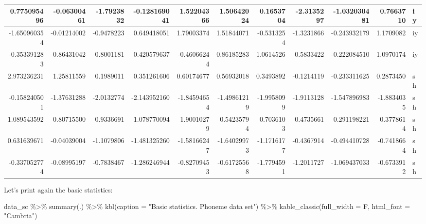 \documentclass[
]{article}
\newenvironment{Shaded}{\begin{snugshade}}{\end{snugshade}}
\newcommand{\AttributeTok}[1]{\textcolor[rgb]{0.77,0.63,0.00}{#1}}
\newcommand{\FunctionTok}[1]{\textcolor[rgb]{0.00,0.00,0.00}{#1}}
\newcommand{\NormalTok}[1]{#1}
\newcommand{\SpecialCharTok}[1]{\textcolor[rgb]{0.00,0.00,0.00}{#1}}
\newcommand{\StringTok}[1]{\textcolor[rgb]{0.31,0.60,0.02}{#1}}
\begin{document}
\begin{table}
\begin{tabular}[t]{r|r|r|r|r|r|r|r|r|r|l}
0.775095496 & -0.06300461 & -1.7923832 & -0.128169041 & 1.52204366 & 1.50642024 & 0.1653704 & -2.3135297 & -1.032030481 & 0.7663710 & iy\\
\hline
-1.650960354 & -0.01214002 & -0.9478223 & 0.649418051 & 1.79003374 & 1.51844071 & -0.5313254 & -1.3231866 & -0.243932179 & 1.1709082 & iy\\
\hline
-0.353391283 & 0.86431042 & 0.8001181 & 0.420579637 & -0.46066244 & 0.86185283 & 1.0614526 & 0.5833422 & -0.222084510 & 1.0970174 & iy\\
\hline
2.973236231 & 1.25811559 & 0.1989011 & 0.351261606 & 0.60174677 & 0.56932018 & 0.3493892 & -0.1214119 & -0.233311625 & 0.2873450 & sh\\
\hline
-0.158240501 & -1.37631288 & -2.0132774 & -2.143952160 & -1.84594654 & -1.49861219 & -1.9958099 & -1.9113128 & -1.547896983 & -1.8834035 & sh\\
\hline
1.089543592 & 0.80715500 & -0.9336691 & -1.078770094 & -1.90010279 & -0.54235794 & -0.7036103 & -0.4735661 & -0.291198221 & -0.3778614 & sh\\
\hline
0.631639671 & -0.04039004 & -1.1079806 & -1.481325260 & -1.58166247 & -1.64029973 & -1.1716177 & -0.4367914 & -0.494410728 & -0.7418664 & sh\\
\hline
-0.337052774 & -0.08995197 & -0.7838467 & -1.286246944 & -0.82709453 & -0.61725568 & -1.7794591 & -1.2011727 & -1.069437033 & -0.6733912 & sh\\
\hline
\end{tabular}
\end{table}

Let's print again the basic statistics:

\begin{Shaded}
\begin{Highlighting}[]
\NormalTok{data\_sc }\SpecialCharTok{\%\textgreater{}\%} 
  \FunctionTok{summary}\NormalTok{(.) }\SpecialCharTok{\%\textgreater{}\%} 
  \FunctionTok{kbl}\NormalTok{(}\AttributeTok{caption =} \StringTok{"Basic statistics. Phoneme data set"}\NormalTok{) }\SpecialCharTok{\%\textgreater{}\%}
  \FunctionTok{kable\_classic}\NormalTok{(}\AttributeTok{full\_width =}\NormalTok{ F, }\AttributeTok{html\_font =} \StringTok{"Cambria"}\NormalTok{)}
\end{Highlighting}
\end{Shaded}
\end{document}
